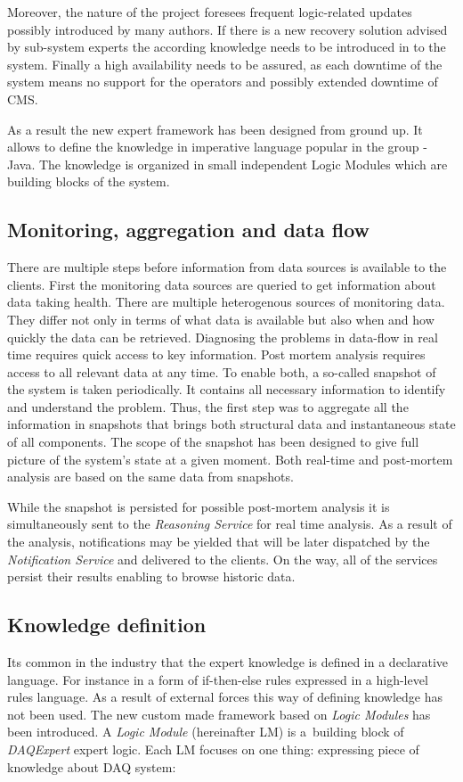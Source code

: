 \documentclass[a4paper]{jpconf}
\begin{document}
Moreover, the nature of the project foresees frequent logic-related updates possibly introduced by many authors. If there is a new recovery solution advised by sub-system experts the according knowledge needs to be introduced in to the system. Finally a high availability needs to be assured, as each downtime of the system means no support for the operators and possibly extended downtime of CMS. 

As a result the new expert framework has been designed from ground up. It allows to define the knowledge in imperative language popular in the group - Java. The knowledge is organized in small independent Logic Modules which are building blocks of the system.


\subsection{Monitoring, aggregation and data flow}

There are multiple steps before information from data sources is available to the clients. First the monitoring data sources are queried to get information about data taking health. There are multiple heterogenous sources of monitoring data. They differ not only in terms of what data is available but also when and how quickly the data can be retrieved. Diagnosing the problems in data-flow in real time requires quick access to key information. Post mortem analysis requires access to all relevant data at any time. To enable both, a so-called snapshot of the system is taken periodically. It contains all necessary information to identify and understand the problem. Thus, the first step was to aggregate all the information in snapshots that brings both structural data and instantaneous state of all components. The scope of the snapshot has been designed to give full picture of the system's state at a given moment. Both real-time and post-mortem analysis are based on the same data from snapshots.

While the snapshot is persisted for possible post-mortem analysis it is simultaneously sent to the {\it Reasoning Service} for real time analysis. As a result of the analysis, notifications may be yielded that will be later dispatched by the {\it Notification Service} and delivered to the clients. On the way, all of the services persist their results enabling to browse historic data.


\subsection{Knowledge definition}
Its common in the industry that the expert knowledge is defined in a declarative language. For instance in a form of if-then-else rules expressed in a high-level rules language. As a result of external forces this way of defining knowledge has not been used. The new custom made framework based on {\it Logic Modules} has been introduced. A {\it Logic Module} (hereinafter LM) is a~building block of {\it DAQExpert} expert logic. Each LM focuses on one thing: expressing piece of knowledge about DAQ system:
\end{document}
